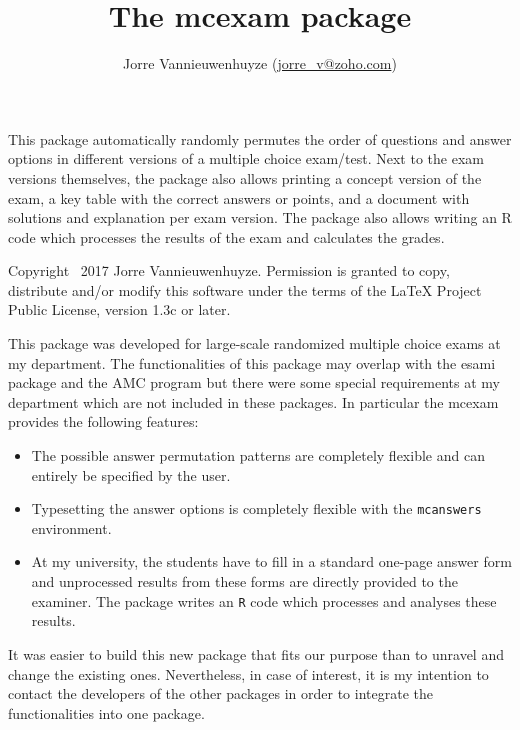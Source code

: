 \documentclass{article}
\title{The \textsf{mcexam} package}
\author{Jorre Vannieuwenhuyze (\url{jorre_v@zoho.com})}
\makeatletter
\renewcommand\tableofcontents{%
    \@starttoc{toc}%
}
\makeatother
\begin{document}
\sloppy
\maketitle 



{\small\noindent
This package automatically randomly permutes the order of questions and answer options in different versions of a multiple choice exam/test. Next to the exam versions themselves, the package also allows printing a concept version of the exam, a key table with the correct answers or points, and a document with solutions and explanation per exam version. The package also allows writing an R code which processes the results of the exam and calculates the grades.}


{\scriptsize\noindent\sffamily
Copyright \textcopyright\ 2017 Jorre Vannieuwenhuyze. Permission is granted to copy, distribute and/or modify this software under the terms of the LaTeX Project Public License, version 1.3c or later.
}


\tableofcontents

\clearpage





This package was developed for large-scale randomized multiple choice exams at my department. The functionalities of this package may overlap with the \textsf{esami} package and the \textsf{AMC} program but there were some special requirements at my department which are not included in these packages. In particular the \textsf{mcexam} provides the following features:
\begin{itemize}
 \item The possible answer permutation patterns are completely flexible and can entirely be specified by the user.
 \item Typesetting the answer options is completely flexible with the \verb+mcanswers+ environment.
 \item At my university, the students have to fill in a standard one-page answer form and unprocessed results from these forms are directly provided to the examiner. The package writes an \verb+R+ code which processes and analyses these results.
\end{itemize}
It was easier to build this new package that fits our purpose than to unravel and change the existing ones. Nevertheless, in case of interest, it is my intention to contact the developers of the other packages in order to integrate the functionalities into one package.
\end{document}
